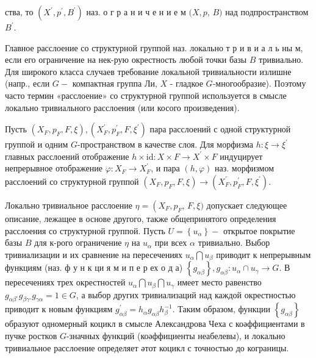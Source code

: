 \documentclass[10pt]{article}
\begin{document}
ства, то $\left(X^{\prime}, p^{\prime}, B^{\prime}\right)$ наз. о г р а н и ч е н и е м $(X, p$, $B)$ над подпространством $B^{\prime}$.



Главное расслоение со структурной группой наз. локально т р и в и а л ь ны м, если его ограничение на нек-рую окрестность любой точки базы $B$ тривиально. Для широкого класса случаев требование локальной тривиальности излишне (напр., если $G-$ компактная группа Ли, $X$ - гладкое $G$-многообразие). Поэтому часто термин «расслоение» со структурной группой используется в смысле локально тривиального расслоения (или косого произведения).



Пусть $\left(X_{F}, p_{F}, F, \xi\right),\left(X_{F}^{\prime}, p_{F}^{\prime}, F, \xi^{\prime}\right)$ пара расслоений с одной структурной группой и одним $G$-пространством в качестве слоя. Для морфизма $h: \xi \rightarrow \xi^{\prime}$ главных расслоений отображение $h \times \mathrm{id}: X \times F \rightarrow X^{\prime} \times F$ индуцирует непрерывное отображение $\varphi: X_{F} \rightarrow X_{F}^{\prime}$, и пара $(h, \varphi)$ наз. морфизмом расслоений со структурной группой $\left(X_{F}, p_{F}, F, \xi\right) \rightarrow\left(X_{F}^{\prime}, p_{F}^{\prime}, F, \xi^{\prime}\right)$.



Локально тривиальное расслоение $\eta=\left(X_{F}, p_{F}\right.$, $F, \xi)$ допускает следующее описание, лежащее в основе другого, также общепринятого определения расслоения со структурной группой. Пусть $U=\left\{u_{\alpha}\right\}-$ открытое покрытие базы $B$ для к-рого ограничение $\eta$ на $u_{\alpha}$ при всех $\alpha$ тривиально. Выбор тривиализации и их сравнение на пересечениях $u_{\alpha} \bigcap u_{\beta}$ приводит к непрерывным функциям (наз. ф у н к ци я м и п е р ех о д а) $\left\{g_{\alpha \beta}\right\}, g_{\alpha \beta}: u_{\alpha} \cap u_{\gamma} \rightarrow G$. В пересечениях трех окрестностей $u_{\alpha} \bigcap u_{\beta} \bigcap u_{\gamma}$ имеет место равенство $g_{\alpha \beta^{\circ}} g_{\beta \gamma^{\circ}} g_{\gamma \alpha}=1 \in G$, а выбор других тривиализаций над каждой окрестностью приводит к новым функциям $g_{\alpha \beta}^{\prime}=h_{\alpha} g_{\alpha \beta} h_{\beta}^{-1}$. Таким образом, функции $\left\{g_{\alpha \beta}\right\}$ образуют одномерный коцикл в смысле Александрова Чеха с коәффициентами в пучке ростков $G$-значных функций (коәффициенты неабелевы), и локально тривиальное расслоение определяет әтот коцикл с точностью до кограницы.
\end{document}
